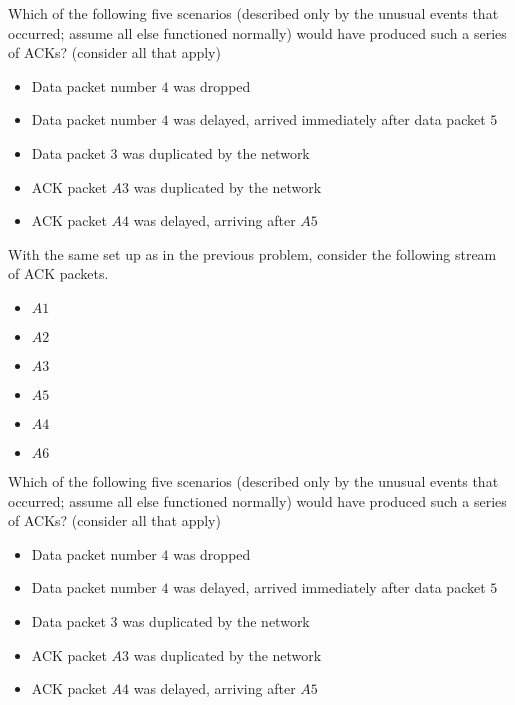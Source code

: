 \documentclass{supervision}
\begin{document}
\begin{questions}
\begin{parts}
\begin{subparts}
                Which of the following five scenarios (described only by the
                unusual events that occurred; assume all else functioned
                normally) would have produced such a series of ACKs? (consider
                all that apply)

                \begin{itemize}
                  \item Data packet number $4$ was dropped
                  \item Data packet number $4$ was delayed, arrived immediately
                    after data packet $5$
                  \item Data packet $3$ was duplicated by the network
                  \item ACK packet $A3$ was duplicated by the network
                  \item ACK packet $A4$ was delayed, arriving after $A5$
                \end{itemize}

              \subpart With the same set up as in the previous problem,
                consider the following stream of ACK packets.

                \begin{itemize}
                  \item $A1$
                  \item $A2$
                  \item $A3$
                  \item $A5$
                  \item $A4$
                  \item $A6$
                \end{itemize}

                Which of the following five scenarios (described only by the
                unusual events that occurred; assume all else functioned
                normally) would have produced such a series of ACKs? (consider
                all that apply)

                \begin{itemize}
                  \item Data packet number $4$ was dropped
                  \item Data packet number $4$ was delayed, arrived immediately
                  after data packet $5$
                  \item Data packet $3$ was duplicated by the network
                  \item ACK packet $A3$ was duplicated by the network
                  \item ACK packet $A4$ was delayed, arriving after $A5$
                \end{itemize}


\end{subparts}
\end{parts}
\end{questions}
\end{document}
